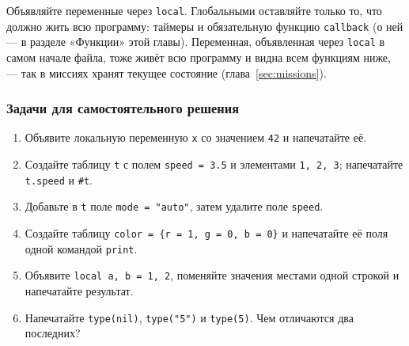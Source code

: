 \begin{rulebox}
Объявляйте переменные через \verb|local|. Глобальными оставляйте только то, что должно жить всю программу: таймеры и обязательную функцию \verb|callback| (о ней --- в разделе «Функции» этой главы). Переменная, объявленная через \verb|local| в самом начале файла, тоже живёт всю программу и видна всем функциям ниже, --- так в миссиях хранят текущее состояние (глава~\ref{sec:missions}).
\end{rulebox}

\subsubsection*{Задачи для самостоятельного решения}
\begin{enumerate}
  \item Объявите локальную переменную \verb|x| со значением \verb|42| и напечатайте её.
  \item Создайте таблицу \verb|t| с полем \verb|speed = 3.5| и элементами \verb|1, 2, 3|; напечатайте \verb|t.speed| и \verb|#t|.
  \item Добавьте в \verb|t| поле \verb|mode = "auto"|, затем удалите поле \verb|speed|.
  \item Создайте таблицу \verb|color = {r = 1, g = 0, b = 0}| и напечатайте её поля одной командой \verb|print|.
  \item Объявите \verb|local a, b = 1, 2|, поменяйте значения местами одной строкой и напечатайте результат.
  \item Напечатайте \verb|type(nil)|, \verb|type("5")| и \verb|type(5)|. Чем отличаются два последних?
\end{enumerate}
